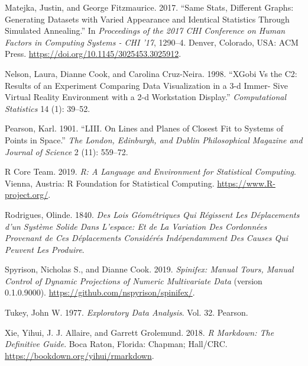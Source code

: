 \documentclass[
  11,
]{article}
\begin{document}
\leavevmode\hypertarget{ref-matejka_same_2017}{}%
Matejka, Justin, and George Fitzmaurice. 2017. ``Same Stats, Different Graphs: Generating Datasets with Varied Appearance and Identical Statistics Through Simulated Annealing.'' In \emph{Proceedings of the 2017 CHI Conference on Human Factors in Computing Systems - CHI '17}, 1290--4. Denver, Colorado, USA: ACM Press. \url{https://doi.org/10.1145/3025453.3025912}.

\leavevmode\hypertarget{ref-nelson_xgobi_1998}{}%
Nelson, Laura, Dianne Cook, and Carolina Cruz-Neira. 1998. ``XGobi Vs the C2: Results of an Experiment Comparing Data Visualization in a 3-d Immer- Sive Virtual Reality Environment with a 2-d Workstation Display.'' \emph{Computational Statistics} 14 (1): 39--52.

\leavevmode\hypertarget{ref-pearson_liii._1901}{}%
Pearson, Karl. 1901. ``LIII. On Lines and Planes of Closest Fit to Systems of Points in Space.'' \emph{The London, Edinburgh, and Dublin Philosophical Magazine and Journal of Science} 2 (11): 559--72.

\leavevmode\hypertarget{ref-r_core_team_r:_2019}{}%
R Core Team. 2019. \emph{R: A Language and Environment for Statistical Computing}. Vienna, Austria: R Foundation for Statistical Computing. \url{https://www.R-project.org/}.

\leavevmode\hypertarget{ref-rodrigues_lois_1840}{}%
Rodrigues, Olinde. 1840. \emph{Des Lois Géométriques Qui Régissent Les Déplacements d'un Système Solide Dans L'espace: Et de La Variation Des Cordonnées Provenant de Ces Déplacements Considérés Indépendamment Des Causes Qui Peuvent Les Produire}.

\leavevmode\hypertarget{ref-spyrison_spinifex_2019}{}%
Spyrison, Nicholas S., and Dianne Cook. 2019. \emph{Spinifex: Manual Tours, Manual Control of Dynamic Projections of Numeric Multivariate Data} (version 0.1.0.9000). \url{https://github.com/nspyrison/spinifex/}.

\leavevmode\hypertarget{ref-tukey_exploratory_1977}{}%
Tukey, John W. 1977. \emph{Exploratory Data Analysis}. Vol. 32. Pearson.

\leavevmode\hypertarget{ref-xie_r_2018}{}%
Xie, Yihui, J. J. Allaire, and Garrett Grolemund. 2018. \emph{R Markdown: The Definitive Guide}. Boca Raton, Florida: Chapman; Hall/CRC. \url{https://bookdown.org/yihui/rmarkdown}.
\end{document}
